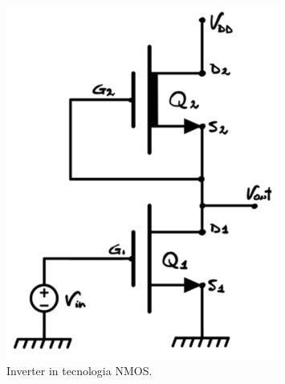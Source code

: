 \begin{figure}[H]
  \centering
  \includegraphics[width=0.8\textwidth]{images/2.5.1.1.png}
  \caption{Inverter in tecnologia NMOS.}
  \label{fig:NMOS_inverter}
\end{figure}

